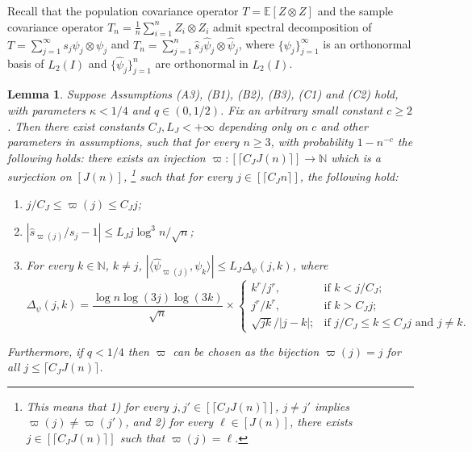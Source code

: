 \documentclass[11pt,a4paper]{article}
\renewcommand{\hat}{\widehat}
\theoremstyle{definition}
\theoremstyle{plain}
\newtheorem{lemma}{Lemma}[section]
\theoremstyle{remark}
\begin{document}
Recall that the population covariance operator $T=\mathbb E[Z\otimes Z]$ and the sample covariance operator $T_n=\frac{1}{n}\sum_{i=1}^nZ_i\otimes Z_i$ admit spectral decomposition of
$T=\sum_{j=1}^{\infty}s_j\psi_j\otimes\psi_j$ and $T_n=\sum_{j=1}^n\hat s_j\hat\psi_j\otimes\hat\psi_j$, where $\{\psi_j\}_{j=1}^{\infty}$ is an orthonormal basis of $L_2(I)$ and $\{\hat\psi_j\}_{j=1}^n$ are orthonormal in $L_2(I)$.
\begin{lemma}
Suppose Assumptions (A3), (B1), (B2), (B3), (C1) and (C2) hold, with parameters $\kappa<1/4$ and $q\in(0,1/2)$.
Fix an arbitrary small constant $c\geq 2$.
Then there exist constants $C_J,L_J<+\infty$ depending only on $c$ and other parameters in assumptions, such that for every $n\geq 3$, 
with probability $1-n^{-c}$ the following holds: there exists an injection $\varpi:[\lceil C_J J(n)\rceil]\to \mathbb N$ which is a surjection on $[J(n)]$,
\footnote{This means that 1) for every $j,j'\in[\lceil C_JJ(n)\rceil]$, $j\neq j'$ implies $\varpi(j)\neq\varpi(j')$, and 2) for every $\ell\in[J(n)]$, there exists $j\in[\lceil C_JJ(n)\rceil]$ such that $\varpi(j)=\ell$.}
 such that for every $j\in[\lceil C_J n\rceil]$, the following hold:
\begin{enumerate}
\item $j/C_J\leq \varpi(j)\leq C_J j$;
\item $|\hat s_{\varpi(j)}/s_j-1|\leq L_J j\log^3 n/\sqrt{n}$;
\item For every $k\in\mathbb N$, $k\neq j$, $|\langle\hat\psi_{\varpi(j)},\psi_k\rangle|\leq L_J\Delta_\psi(j,k)$, where
$$
\Delta_\psi(j,k) = \frac{\log n\log(3j)\log(3k)}{\sqrt{n}}\times \left\{\begin{array}{ll} k^r/j^r,& \text{if }k< j/C_J;\\ j^r/k^r,& \text{if } k> C_Jj;\\ \sqrt{jk}/|j-k|;& \text{if $j/C_J \leq k \leq C_Jj$ and $j\neq k$.}\end{array}\right.
$$
\end{enumerate}
Furthermore, if $q<1/4$ then $\varpi$ can be chosen as the bijection $\varpi(j)=j$ for all $j\leq \lceil C_JJ(n)\rceil$.
\label{lem:stability}
\end{lemma}

\end{document}

